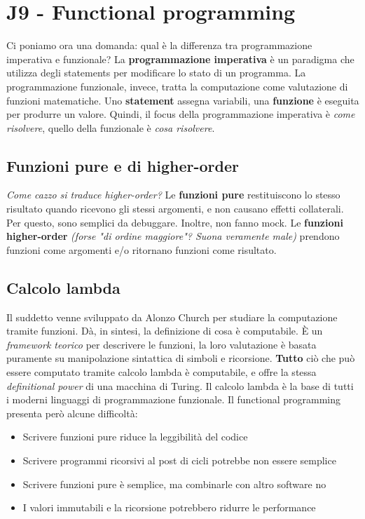 \documentclass[11pt]{article}
\begin{document}
\section{J9 - Functional programming}
Ci poniamo ora una domanda: qual è la differenza tra programmazione imperativa e funzionale? 
La \textbf{programmazione imperativa} è un paradigma che utilizza degli \glspl{statement} per modificare lo stato di un programma. La programmazione funzionale, invece, tratta la computazione come valutazione di funzioni matematiche. Uno \textbf{\gls{statement}} assegna variabili, una \textbf{funzione} è eseguita per produrre un valore. Quindi, il focus della programmazione imperativa è \textit{come risolvere}, quello della funzionale è \textit{cosa risolvere}.
\subsection{Funzioni pure e di higher-order}
\textit{Come cazzo si traduce higher-order?} Le \textbf{funzioni pure} restituiscono lo stesso risultato quando ricevono gli stessi argomenti, e non causano effetti collaterali. Per questo, sono semplici da debuggare. Inoltre, non fanno \gls{mock}. Le \textbf{funzioni higher-order} \textit{(forse "di ordine maggiore"? Suona veramente male)} prendono funzioni come argomenti e/o ritornano funzioni come risultato. 
\subsection{Calcolo lambda}
Il suddetto venne sviluppato da Alonzo Church per studiare la computazione tramite funzioni. Dà, in sintesi, la definizione di cosa è computabile. È un \textit{framework teorico} per descrivere le funzioni, la loro valutazione è basata puramente su manipolazione sintattica di simboli e ricorsione. \textbf{Tutto} ciò che può essere computato tramite calcolo lambda è computabile, e offre la stessa \textit{definitional power} di una macchina di Turing. Il calcolo lambda è la base di tutti i moderni linguaggi di programmazione funzionale. 
Il functional programming presenta però alcune difficoltà:
\begin{itemize}
    \item Scrivere funzioni pure riduce la leggibilità del codice
    \item Scrivere programmi ricorsivi al post di cicli potrebbe non essere semplice
    \item Scrivere funzioni pure è semplice, ma combinarle con altro software no
    \item I valori immutabili e la ricorsione potrebbero ridurre le performance
\end{itemize} 
\end{document}
